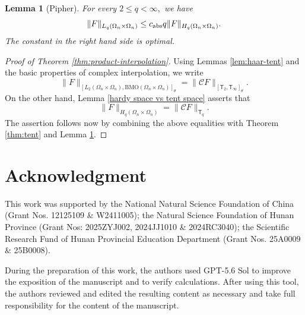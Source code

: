 \documentclass{amsart}
\numberwithin{equation}{section}
\newtheorem{lem}[thm]{Lemma}
\theoremstyle{definition}
\theoremstyle{remark}
\newcommand{\1}{\mathbf 1}
\newcommand{\BMO}{\mathrm{BMO}}
\newcommand{\T}{\mathsf T}
\begin{document}
\begin{lem}[Pipher]\label{lem:product-square}
For every $2\leq q<\infty,$ we have
$$\|F\|_{L_q(\Omega_n\times\Omega_n)}\leq c_{{\rm abs}}q\|F\|_{H_q(\Omega_n\times\Omega_n)}.$$
The constant in the right hand side is optimal.
\end{lem}


\begin{proof}[Proof of Theorem \ref{thm:product-interpolation}] Using Lemmas \ref{lem:haar-tent} and the basic properties of complex interpolation, we write
$$\|F\|_{[L_2(\Omega_n\times\Omega_n),\BMO(\Omega_n\times\Omega_n)]_{\theta}}=\|\mathcal{C}F\|_{[\T_2,\T_{\infty}]_{\theta}}.$$
On the other hand, Lemma \ref{hardy space vs tent space} asserts that
$$\|F\|_{H_q(\Omega_n\times\Omega_n)}=\|\mathcal{C}F\|_{\T_q}.$$
The assertion follows now by combining the above equalities with Theorem  \ref{thm:tent} and Lemma \ref{lem:product-square}.
\end{proof}

\section*{Acknowledgment}

This work was supported by the National Natural Science Foundation of China
(Grant Nos. 12125109 \& W2411005); the Natural Science Foundation of Hunan
Province (Grant Nos: 2025ZYJ002, 2024JJ1010 \& 2024RC3040); the Scientific Research Fund of Hunan Provincial Education Department (Grant Nos. 25A0009
\& 25B0008). 

During the preparation of this work, the authors used GPT-5.6 Sol to improve the exposition of the manuscript and to verify calculations. After using this tool, the authors reviewed and edited the resulting content as necessary and take full responsibility for the content of the manuscript.
\end{document}
